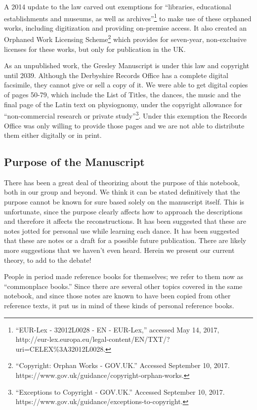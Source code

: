 \documentclass[12pt,letter]{article} %
\begin{document}
A 2014 update to the law carved out exemptions for “libraries, educational establishments and museums, as well as archives”\footnote{“EUR-Lex - 32012L0028 - EN - EUR-Lex,” accessed May 14, 2017,\\  http://eur-lex.europa.eu/legal-content/EN/TXT/?uri=CELEX\%3A32012L0028.} to make use of these orphaned works, including digitization and providing on-premise access.  It also created an Orphaned Work Licensing Scheme\footnote{“Copyright: Orphan Works - GOV.UK.” Accessed September 10, 2017.\\  https://www.gov.uk/guidance/copyright-orphan-works.} which provides for seven-year, non-exclusive licenses for these works, but only for publication in the UK.  

As an unpublished work, the Gresley Manuscript is under this law and copyright until 2039.  Although the Derbyshire Records Office has a complete digital facsimile, they cannot give or sell a copy of it.  We were able to get digital copies of pages 50-79, which include the List of Titles, the dances, the music and the final page of the Latin text on physiognomy, under the copyright allowance for “non-commercial research or private study”\footnote{“Exceptions to Copyright - GOV.UK.” Accessed September 10, 2017.\\  https://www.gov.uk/guidance/exceptions-to-copyright.}.  Under this exemption the Records Office was only willing to provide those pages and we are not able to distribute them either digitally or in print.  

\subsection{Purpose of the Manuscript}

There has been a great deal of theorizing about the purpose of this notebook, both in our group and beyond. We think it can be stated definitively that the purpose cannot be known for sure based solely on the manuscript itself. This is unfortunate, since the purpose clearly affects how to approach the descriptions and therefore it affects the reconstructions. It has been suggested that these are notes jotted for personal use while learning each dance. It has been suggested that these are notes or a draft for a possible future publication. There are likely more suggestions that we haven’t even heard. Herein we present our current theory, to add to the debate!

People in period made reference books for themselves; we refer to them now as “commonplace books.” Since there are several other topics covered in the same notebook, and since those notes are known to have been copied from other reference texts, it put us in mind of these kinds of personal reference books. 
\end{document}
